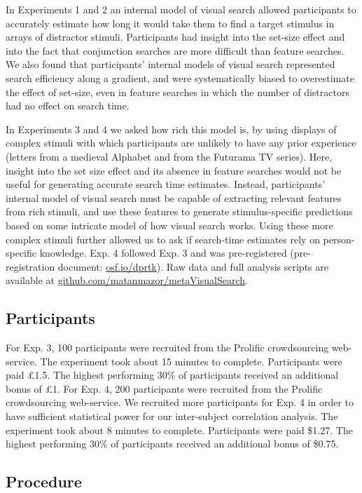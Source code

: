 \documentclass[12pt,twoside]{reedthesis}
\begin{document}
In Experiments 1 and 2 an internal model of visual search allowed participants to accurately estimate how long it would take them to find a target stimulus in arrays of distractor stimuli. Participants had insight into the set-size effect and into the fact that conjunction searches are more difficult than feature searches. We also found that participants' internal models of visual search represented search efficiency along a gradient, and were systematically biased to overestimate the effect of set-size, even in feature searches in which the number of distractors had no effect on search time.

In Experiments 3 and 4 we asked how rich this model is, by using displays of complex stimuli with which participants are unlikely to have any prior experience (letters from a medieval Alphabet and from the Futurama TV series). Here, insight into the set size effect and its absence in feature searches would not be useful for generating accurate search time estimates. Instead, participants' internal model of visual search must be capable of extracting relevant features from rich stimuli, and use these features to generate stimulus-specific predictions based on some intricate model of how visual search works. Using these more complex stimuli further allowed us to ask if search-time estimates rely on person-specific knowledge. Exp. 4 followed Exp. 3 and was pre-registered (pre-registration document: \url{osf.io/dprtk}). Raw data and full analysis scripts are available at \url{github.com/matanmazor/metaVisualSearch}.

\hypertarget{participants-3}{%
\subsection{Participants}\label{participants-3}}

For Exp. 3, 100 participants were recruited from the Prolific crowdsourcing web-service. The experiment took about 15
minutes to complete. Participants were paid £1.5. The highest performing 30\% of participants received an additional bonus of £1. For Exp. 4, 200 participants were recruited from the Prolific crowdsourcing web-service. We recruited more participants for Exp. 4 in order to have sufficient statistical power for our inter-subject correlation analysis. The experiment took about 8 minutes to complete. Participants were paid \$1.27. The highest performing 30\% of participants received an additional bonus of \$0.75.

\hypertarget{procedure-3}{%
\subsection{Procedure}\label{procedure-3}}
\end{document}
